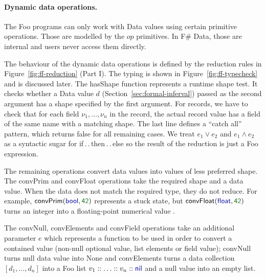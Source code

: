 \documentclass[10pt,nocopyrightspace]{sigplanconf}
\newcommand{\kvd}[1]{\textnormal{\textcolor{kvdclr}{\sffamily #1}}}
\newcommand{\num}[1]{\textnormal{\textcolor{numclr}{\sffamily #1}}}
\newcommand{\ident}[1]{\textnormal{\sffamily #1}}
\begin{document}
\paragraph{Dynamic data operations.}

The Foo programs can only work with \ident{Data} values using certain primitive operations. Those are modelled
by the $op$ primitives. In F\# Data, those are internal and users never access them directly.

The behaviour of the dynamic data operations is defined by the reduction rules in
Figure~\ref{fig:ff-reduction} (Part I). The typing is shown in Figure~\ref{fig:ff-typecheck} and is
discussed later. The \ident{hasShape} function represents a runtime shape test.
It checks whether a \ident{Data} value $d$ (Section~\ref{sec:formal-inferval}) passed as the second
argument has a shape specified by the first argument. For records, we have to check that for each
field $\nu_1, \ldots, \nu_n$ in the record, the actual record value has a field of the same name
with a matching shape. The last line defines a ``catch all'' pattern, which returns \kvd{false}
for all remaining cases. We treat $e_1 \vee e_2$ and $e_1 \wedge e_2$ as a syntactic sugar for
\kvd{if}\,.\,.\,\kvd{then}\,.\,.\,\kvd{else} so the result of the reduction is just a Foo
expression.

The remaining operations convert data values into values of less preferred shape.
The \ident{convPrim} and \ident{convFloat} operations take the required shape and a data value.
When the data does not match the required type, they do not reduce. For example,
$\ident{convPrim}(\kvd{bool}, \num{42})$ represents a stuck state, but $\ident{convFloat}(\kvd{float}, \num{42})$
turns an integer \num{42} into a floating-point numerical value \num{42.0}.

The \ident{convNull}, \ident{convElements} and \ident{convField} operations take an additional
parameter $e$ which represents a function to be used in order to convert a contained value (non-null
optional value, list elements or field value); \ident{convNull} turns \kvd{null} data value into
\ident{None} and \ident{convElements} turns a data collection $[d_1, \ldots, d_n]$ into a Foo list
$v_1 :: \ldots :: v_n :: \kvd{nil}$ and a \kvd{null} value into an empty list.
\end{document}

